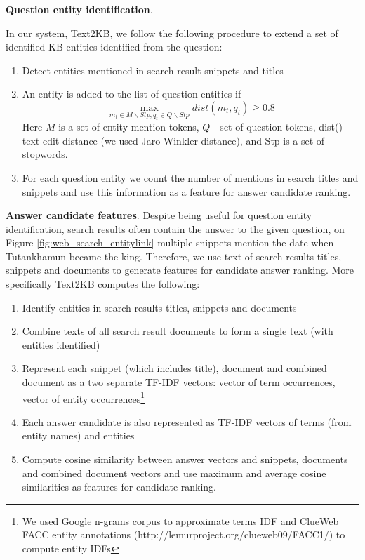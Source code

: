 \textbf{Question entity identification}.

In our system, Text2KB, we follow the following procedure to extend a set of identified KB entities identified from the question:
\begin{enumerate}
\item Detect entities mentioned in search result snippets and titles
\item An entity is added to the list of question entities if 
$$\max_{m_t \in M\backslash Stp, q_t \in Q\backslash Stp} dist(m_t, q_t) \geq 0.8$$
Here $M$ is a set of entity mention tokens, $Q$ - set of question tokens, dist() - text edit distance (we used Jaro-Winkler distance), and Stp is a set of stopwords.
\item For each question entity we count the number of mentions in search titles and snippets and use this information as a feature for answer candidate ranking.
\end{enumerate}

\textbf{Answer candidate features}.
Despite being useful for question entity identification, search results often contain the answer to the given question, \eg on Figure \ref{fig:web_search_entitylink} multiple snippets mention the date when Tutankhamun became the king.
Therefore, we use text of search results titles, snippets and documents to generate features for candidate answer ranking.
More specifically Text2KB computes the following:
\begin{enumerate}
\item Identify entities in search results titles, snippets and documents
\item Combine texts of all search result documents to form a single text (with entities identified)
\item Represent each snippet (which includes title), document and combined document as a two separate TF-IDF vectors: vector of term occurrences, vector of entity occurrences\footnote{We used Google n-grams corpus to approximate terms IDF and ClueWeb FACC entity annotations (http://lemurproject.org/clueweb09/FACC1/) to compute entity IDFs}
\item Each answer candidate is also represented as TF-IDF vectors of terms (from entity names) and entities
\item Compute cosine similarity between answer vectors and snippets, documents and combined document vectors and use maximum and average cosine similarities as features for candidate ranking.
\end{enumerate}

